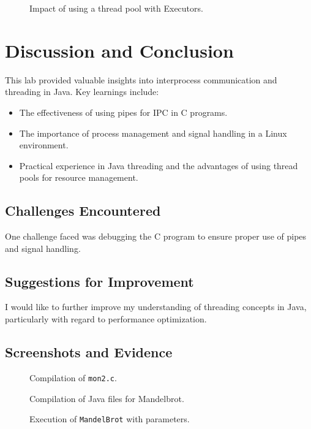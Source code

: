 \documentclass[a4paper,12pt]{article}
\begin{document}
\begin{figure}[h]
    \centering
    \caption{Impact of using a thread pool with Executors.}
\end{figure}

\section{Discussion and Conclusion}
This lab provided valuable insights into interprocess communication and threading in Java. Key learnings include:
\begin{itemize}
    \item The effectiveness of using pipes for IPC in C programs.
    \item The importance of process management and signal handling in a Linux environment.
    \item Practical experience in Java threading and the advantages of using thread pools for resource management.
\end{itemize}

\subsection*{Challenges Encountered}
One challenge faced was debugging the C program to ensure proper use of pipes and signal handling.

\subsection*{Suggestions for Improvement}
I would like to further improve my understanding of threading concepts in Java, particularly with regard to performance optimization.

\subsection*{Screenshots and Evidence}
\begin{figure}[h]
    \centering
    \caption{Compilation of \texttt{mon2.c}.}
\end{figure}

\begin{figure}[h]
    \centering
    \caption{Compilation of Java files for Mandelbrot.}
\end{figure}

\begin{figure}[h]
    \centering
    \caption{Execution of \texttt{MandelBrot} with parameters.}
\end{figure}
\end{document}
